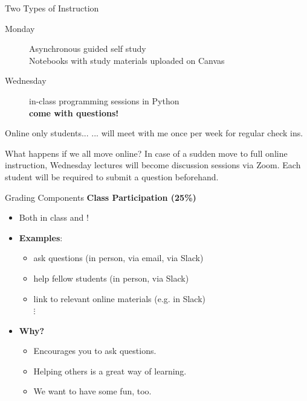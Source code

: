\documentclass[professionalfonts, xcolor={usenames,svgnames,x11names,table}]{beamer}
\begin{document}
\begin{frame}{Two Types of Instruction}
    \begin{description}
        \item[Monday] Asynchronous guided self study\\
        				Notebooks with study materials uploaded on Canvas
        \item[Wednesday] in-class programming sessions in Python\\
        					\textbf{come with questions!}
    \end{description}

    \begin{block}{Online only students...}
... will meet with me once per week for regular check ins. 
    \end{block}

    \pause
    \begin{block}{What happens if we all move online?}
 In case of a sudden move to full online instruction, Wednesday lectures will become discussion sessions via Zoom. Each student will be required to submit a question beforehand. 
    \end{block}
\end{frame}

\begin{frame}{Grading Components}
    \textbf{Class Participation (25\%)}
        \begin{itemize}
            \item Both in class and !
            \item \textbf{Examples}:
                \begin{itemize}
                    \item ask questions (in person, via email, via Slack)
                    \item help fellow students (in person, via Slack)
                    \item link to relevant online materials (e.g. in Slack)\\
                        $\vdots$
                \end{itemize}
            \item \textbf{Why?} 
                \begin{itemize}
                    \item Encourages you to ask questions.
                    \item Helping others is a great way of learning.
                    \item We want to have some fun, too.
                \end{itemize}
        \end{itemize}
\end{frame}
\end{document}
